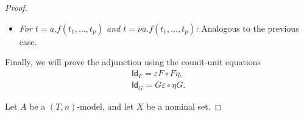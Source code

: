 \documentclass[11pt,a4paper]{amsart}
\newcommand{\Id}{\mathsf{Id}}
\theoremstyle{plain}
\numberwithin{equation}{section}
\newcommand{\+}[1]{\mathcal{#1}\xspace}
\theoremstyle{definition}
\begin{document}
\begin{proof}
\begin{itemize}
\begin{align*}
                &h_m(f_{A, m'}((\varepsilon_A)_{m'}([t_1]_{m'}), \ldots, (\varepsilon_A)_{m'}([t_p]_{m'}))) \\
                =~&\quad\text{(homomorphy)} \\
                &h_m((\varepsilon_A)_m(f_{FA_0, m'}([t_1]_{m'}, \ldots, [t_p]_{m'}))) \\
                =~&\quad\text{(definition)} \\
                &h_m((\varepsilon_A)_m([f(t_1, \ldots, t_p)]_{m})).
            \end{align*}
        \item
            \textit{For \(t = a.f(t_1, \ldots, t_p)\) and \(t = \nu a.f(t_1, \ldots, t_p)\):}
            Analogous to the previous case.
    \end{itemize}

    Finally, we will prove the adjunction using the counit-unit equations
    \begin{gather}
        \Id_F = \varepsilon F \circ F \eta, \label{eq:counitunit1} \\
        \Id_G = G \varepsilon \circ \eta G. \label{eq:counitunit2}
    \end{gather}

    Let \(A\) be a $(T,n)$-model, and let \(X\) be a nominal set.


\end{proof}
\end{document}
